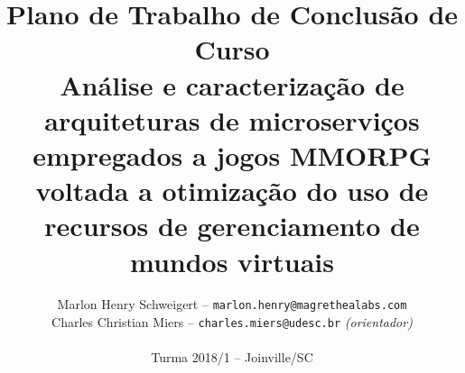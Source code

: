 \documentclass[11pt]{article}
\begin{document}
\pagestyle{fancy}

\title{
Plano de Trabalho de Conclusão de Curso\\
Análise e caracterização de arquiteturas de microserviços empregados a jogos MMORPG voltada a otimização do uso de recursos de gerenciamento de mundos virtuais
}

\author{
Marlon Henry Schweigert -- \texttt{marlon.henry@magrethealabs.com}\\
Charles Christian Miers -- \texttt{charles.miers@udesc.br} {\it (orientador)}\\
~\\
Turma 2018/1 -- Joinville/SC
}
\end{document}
